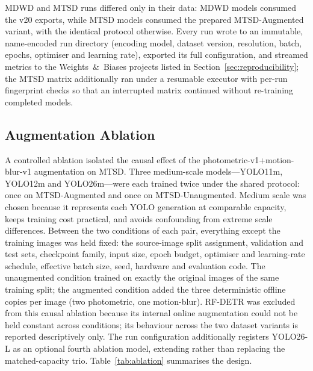 MDWD and MTSD runs differed only in their data: MDWD models consumed the v20 exports, while MTSD models consumed the prepared MTSD-Augmented variant, with the identical protocol otherwise. Every run wrote to an immutable, name-encoded run directory (encoding model, dataset version, resolution, batch, epochs, optimiser and learning rate), exported its full configuration, and streamed metrics to the Weights~\&~Biases projects listed in Section~\ref{sec:reproducibility}; the MTSD matrix additionally ran under a resumable executor with per-run fingerprint checks so that an interrupted matrix continued without re-training completed models.

\subsection{Augmentation Ablation}

A controlled ablation isolated the causal effect of the photometric-v1+motion-blur-v1 augmentation on MTSD. Three medium-scale models---YOLO11m, YOLO12m and YOLO26m---were each trained twice under the shared protocol: once on MTSD-Augmented and once on MTSD-Unaugmented. Medium scale was chosen because it represents each YOLO generation at comparable capacity, keeps training cost practical, and avoids confounding from extreme scale differences. Between the two conditions of each pair, everything except the training images was held fixed: the source-image split assignment, validation and test sets, checkpoint family, input size, epoch budget, optimiser and learning-rate schedule, effective batch size, seed, hardware and evaluation code. The unaugmented condition trained on exactly the original images of the same training split; the augmented condition added the three deterministic offline copies per image (two photometric, one motion-blur). RF-DETR was excluded from this causal ablation because its internal online augmentation could not be held constant across conditions; its behaviour across the two dataset variants is reported descriptively only. The run configuration additionally registers YOLO26-L as an optional fourth ablation model, extending rather than replacing the matched-capacity trio. Table~\ref{tab:ablation} summarises the design.

